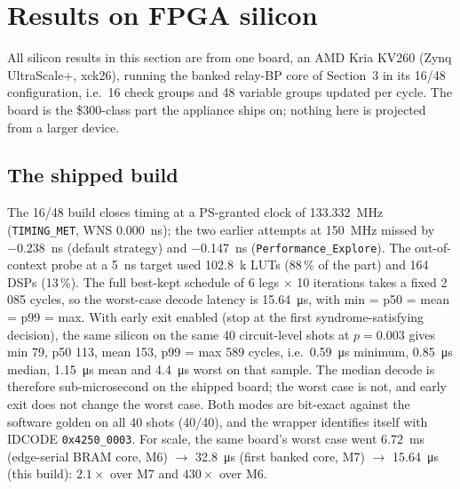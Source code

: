 
\section{Results on FPGA silicon}
\label{sec:silicon}

All silicon results in this section are from one board, an AMD Kria KV260
(Zynq UltraScale+, xck26), running the banked relay-BP core of
Section~3 in its 16/48 configuration, i.e.\ 16 check groups and 48
variable groups updated per cycle. The board is the \$300-class part the
appliance ships on; nothing here is projected from a larger device.

\subsection*{The shipped build}

The 16/48 build closes timing at a PS-granted clock of \SI{133.332}{\MHz}
(\texttt{TIMING\_MET}, WNS \SI{0.000}{\ns}); the two earlier attempts at
\SI{150}{\MHz} missed by \SI{-0.238}{\ns} (default strategy) and
\SI{-0.147}{\ns} (\texttt{Performance\_Explore}). The out-of-context probe
at a \SI{5}{\ns} target used \SI{102.8}{k} LUTs (88\,\% of the part) and 164
DSPs (13\,\%). The full best-kept schedule of 6 legs $\times$ 10 iterations
takes a fixed 2\,085 cycles, so the worst-case decode latency is
\SI{15.64}{\micro\second}, with min = p50 = mean = p99 = max.
With early exit enabled (stop at the first syndrome-satisfying decision),
the same silicon on the same 40 circuit-level shots at $p = 0.003$ gives
min 79, p50 113, mean 153, p99 = max 589 cycles, i.e.\
\SI{0.59}{\micro\second} minimum, \SI{0.85}{\micro\second} median,
\SI{1.15}{\micro\second} mean and \SI{4.4}{\micro\second} worst on that
sample. The median decode is therefore sub-microsecond on the shipped board;
the worst case is not, and early exit does not change the worst case.
Both modes are bit-exact against the software golden on all 40 shots
(40/40), and the wrapper identifies itself with IDCODE \texttt{0x4250\_0003}.
For scale, the same board's worst case went \SI{6.72}{\ms} (edge-serial
BRAM core, M6) $\rightarrow$ \SI{32.8}{\micro\second} (first banked core,
M7) $\rightarrow$ \SI{15.64}{\micro\second} (this build): $2.1\times$ over
M7 and $430\times$ over M6.

